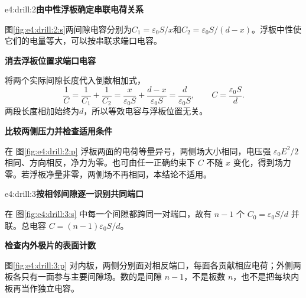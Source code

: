 \begin{drillsolution}{e4:drill:2}\textbf{由中性浮板确定串联电荷关系}\par\nobreak
图\ref{fig:e4:drill:2:s}两间隙电容分别为$C_1=\varepsilon_0S/x$和$C_2=\varepsilon_0S/(d-x)$。浮板中性使它们的电量等大，可以按串联求端口电容。

\par\medskip{}\noindent\textbf{消去浮板位置求端口电容}\par\nobreak
将两个实际间隙长度代入倒数相加式，
\[
\frac1C=\frac1{C_1}+\frac1{C_2}
=\frac{x}{\varepsilon_0S}+\frac{d-x}{\varepsilon_0S}
=\frac d{\varepsilon_0S},\qquad C=\frac{\varepsilon_0S}{d}.
\]
两段长度相加始终为$d$，所以等效电容与浮板位置无关。



\par\medskip{}\noindent\textbf{比较两侧压力并检查适用条件}\par\nobreak
在 图\ref{fig:e4:drill:2:p} 浮板两面的电荷等量异号，两侧场大小相同，电压强 $\varepsilon_0E^2/2$ 相同、方向相反，净力为零。也可由任一正确约束下 $C$ 不随 $x$ 变化，得到场力零。若浮板净量非零，两侧场不再相同，本结论不适用。\end{drillsolution}
\begin{drillsolution}{e4:drill:3}\textbf{按相邻间隙逐一识别共同端口}\par\nobreak
在 图\ref{fig:e4:drill:3:s} 中每一个间隙都跨同一对端口，故有 $n-1$ 个 $C_0=\varepsilon_0S/d$ 并联。总电容 $C=(n-1)\varepsilon_0S/d$。



\par\medskip{}\noindent\textbf{检查内外极片的表面计数}\par\nobreak
图\ref{fig:e4:drill:3:p} 对内板，两侧分别面对相反端口，每面各贡献相应电荷；外侧两板各只有一面参与主要间隙场。数的是间隙 $n-1$，不是板数 $n$，也不是把每块内板再当作独立电容。\end{drillsolution}
